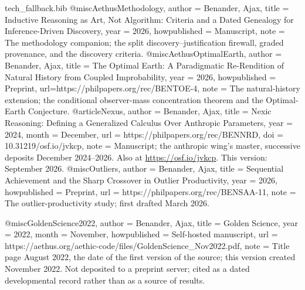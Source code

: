 \begin{filecontents}[overwrite]{tech_fallback.bib}
@misc{AethusMethodology,
  author       = {Benander, Ajax},
  title        = {Inductive Reasoning as Art, Not Algorithm: Criteria and a Dated Genealogy for Inference-Driven Discovery},
  year         = {2026},
  howpublished = {Manuscript},
  note         = {The methodology companion; the split discovery--justification
                  firewall, graded provenance, and the discovery criteria.}
}
@misc{AethusOptimalEarth,
  author       = {Benander, Ajax},
  title        = {The Optimal Earth: A Paradigmatic Re-Rendition of Natural History from Coupled Improbability},
  year         = {2026},
  howpublished = {Preprint},
  url={https://philpapers.org/rec/BENTOE-4},
  note         = {The natural-history extension; the conditional observer-mass
                  concentration theorem and the Optimal-Earth Conjecture.}
}
@article{Nexus,
  author      = {Benander, Ajax},
  title       = {Nexic Reasoning: Defining a Generalized Calculus Over Anthropic Parameters},
  year        = {2024},
  month       = {December},
  url         = {https://philpapers.org/rec/BENNRD},
  doi         = {10.31219/osf.io/jvkcp},
  note        = {Manuscript; the anthropic wing's master, successive deposits
                 December 2024--2026. Also at \url{https://osf.io/jvkcp}.
                 This version: September 2026.}
}
@misc{Outliers,
  author       = {Benander, Ajax},
  title        = {Sequential Achievement and the Sharp Crossover in Outlier Productivity},
  year         = {2026},
  howpublished = {Preprint},
  url          = {https://philpapers.org/rec/BENSAA-11},
  note         = {The outlier-productivity study; first drafted March 2026.}
}

@misc{GoldenScience2022,
  author       = {Benander, Ajax},
  title        = {Golden Science},
  year         = {2022},
  month        = {November},
  howpublished = {Self-hosted manuscript},
  url          = {https://aethus.org/aethic-code/files/GoldenScience_Nov2022.pdf},
  note         = {Title page August 2022, the date of the first version of the source; this version created November 2022. Not deposited to a
                  preprint server; cited as a dated developmental record rather than
                  as a source of results.}
}
\end{filecontents}

